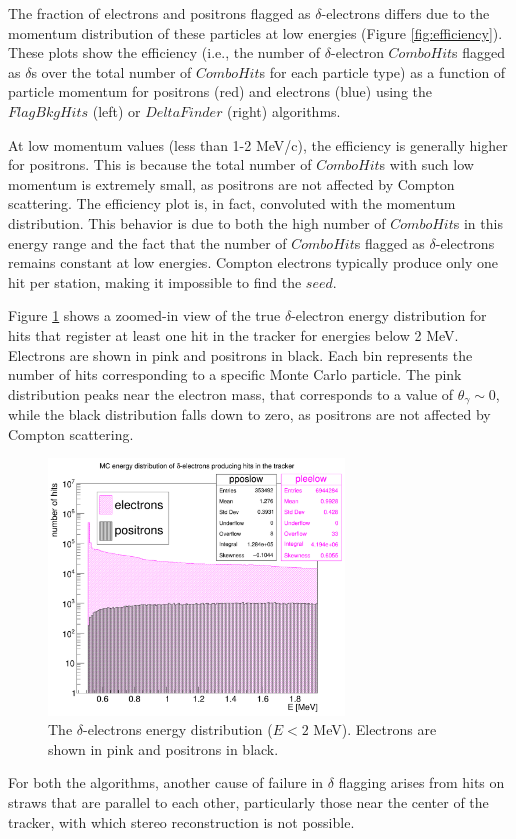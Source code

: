 The fraction of electrons and positrons flagged as $\delta$-electrons 
differs due to the momentum distribution of these particles at low energies 
(Figure \ref{fig:efficiency}). These plots show the efficiency 
(i.e., the number of $\delta$-electron $ComboHit$s flagged as $\delta$s 
over the total number of $ComboHit$s for each particle type) as a function 
of particle momentum for positrons (red) and electrons (blue) using the 
$FlagBkgHits$ (left) or $DeltaFinder$ (right) algorithms. 

At low momentum values (less than 1-2 MeV/c), the efficiency 
is generally higher for positrons. This is because the 
total number of $ComboHit$s with such low momentum is extremely 
small, as positrons are not affected by Compton scattering. 
The efficiency plot is, in fact, convoluted with the momentum 
distribution. This behavior is due to both the high number of 
$ComboHit$s in this energy range and the fact that the number 
of $ComboHit$s flagged as $\delta$-electrons remains constant 
at low energies. Compton electrons typically produce only 
one hit per station, making it impossible to find the $seed$. 

Figure \ref{fig:detail} shows a zoomed-in view of the 
true $\delta$-electron energy distribution for hits that 
register at least one hit in the tracker for energies below 
2 MeV. Electrons are shown in pink and positrons in black. 
Each bin represents the number of hits corresponding to a 
specific Monte Carlo particle. The pink distribution peaks 
near the electron mass, that corresponds to a value of $\theta_\gamma \sim 0$, 
while the black distribution falls down 
to zero, as positrons are not affected by Compton scattering.


\begin{figure}[!h]
    \centering
    \includegraphics[width =0.7\textwidth]{figures/png/Screenshot_20240820_154854.png}
    \caption[The $\delta$-electrons energy distribution.]{The $\delta$-electrons energy distribution ($E<2$ MeV). Electrons 
    are shown in pink and positrons in black.}
    \label{fig:detail}
\end{figure}
For both the algorithms, another cause of failure 
in $\delta$ flagging arises from hits on straws that are 
parallel to each other, particularly those near the center of the tracker, 
with which stereo reconstruction is not possible. 

